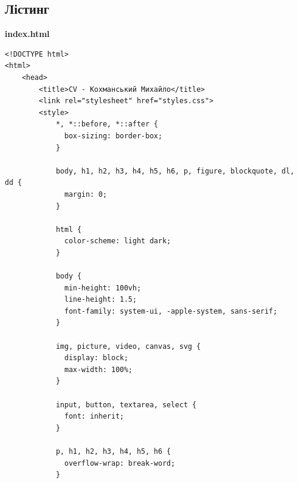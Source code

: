 \documentclass[12pt, a4paper]{article}
\begin{document}
\subsection{Лістинг}
\textbf{index.html}
\begin{lstlisting}
<!DOCTYPE html>
<html>
	<head>
		<title>CV - Кохманський Михайло</title>
		<link rel="stylesheet" href="styles.css">
		<style>		
			*, *::before, *::after {
			  box-sizing: border-box;
			}

			body, h1, h2, h3, h4, h5, h6, p, figure, blockquote, dl, dd {
			  margin: 0;
			}

			html {
			  color-scheme: light dark;
			}

			body {
			  min-height: 100vh;
			  line-height: 1.5;
			  font-family: system-ui, -apple-system, sans-serif;
			}

			img, picture, video, canvas, svg {
			  display: block;
			  max-width: 100%;
			}

			input, button, textarea, select {
			  font: inherit;
			}

			p, h1, h2, h3, h4, h5, h6 {
			  overflow-wrap: break-word;
			}


\end{lstlisting}
\end{document}
